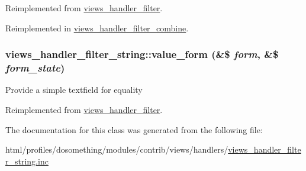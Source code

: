 Reimplemented from \hyperlink{classviews__handler__filter_a8e513b3abbc2559f37b550ca4957b4ae}{views\_\-handler\_\-filter}.

Reimplemented in \hyperlink{classviews__handler__filter__combine_adcae1e0d8c9349fdc10c000bb62f0b50}{views\_\-handler\_\-filter\_\-combine}.\hypertarget{classviews__handler__filter__string_a41c2ed02d24685d046eccd9e751ad916}{
\subsubsection[{value\_\-form}]{\setlength{\rightskip}{0pt plus 5cm}views\_\-handler\_\-filter\_\-string::value\_\-form (\&\$ {\em form}, \/  \&\$ {\em form\_\-state})}}
\label{classviews__handler__filter__string_a41c2ed02d24685d046eccd9e751ad916}
Provide a simple textfield for equality 

Reimplemented from \hyperlink{classviews__handler__filter_a9168b39edae84b20e01a3fd0d810ba66}{views\_\-handler\_\-filter}.

The documentation for this class was generated from the following file:\begin{DoxyCompactItemize}
\item 
html/profiles/dosomething/modules/contrib/views/handlers/\hyperlink{views__handler__filter__string_8inc}{views\_\-handler\_\-filter\_\-string.inc}\end{DoxyCompactItemize}

